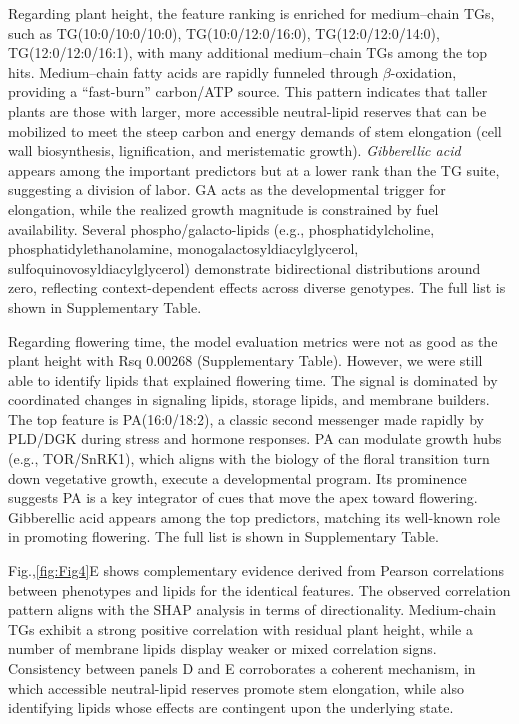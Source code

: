 \documentclass[10pt,letterpaper]{article}
\begin{document}
Regarding plant height, the feature ranking is enriched for medium–chain TGs, such as TG(10{:}0/10{:}0/10{:}0), TG(10{:}0/12{:}0/16{:}0), TG(12{:}0/12{:}0/14{:}0), TG(12{:}0/12{:}0/16{:}1), with many additional medium–chain TGs among the top hits. Medium–chain fatty acids are rapidly funneled through $\beta$-oxidation, providing a ``fast-burn'' carbon/ATP source. This pattern indicates that taller plants are those with larger, more accessible neutral-lipid reserves that can be mobilized to meet the steep carbon and energy demands of stem elongation (cell wall biosynthesis, lignification, and meristematic growth). \textit{Gibberellic acid} appears among the important predictors but at a lower rank than the TG suite, suggesting a division of labor. GA acts as the developmental trigger for elongation, while the realized growth magnitude is constrained by fuel availability. Several phospho/galacto-lipids (e.g., phosphatidylcholine, phosphatidylethanolamine, monogalactosyldiacylglycerol, sulfoquinovosyldiacylglycerol) demonstrate bidirectional distributions around zero, reflecting context-dependent effects across diverse genotypes. The full list is shown in Supplementary Table.

Regarding flowering time, the model evaluation metrics were not as good as the plant height with Rsq 0.00268 (Supplementary Table). However, we were still able to identify lipids that explained flowering time. The signal is dominated by coordinated changes in signaling lipids, storage lipids, and membrane builders. The top feature is PA(16:0/18:2), a classic second messenger made rapidly by PLD/DGK during stress and hormone responses. PA can modulate growth hubs (e.g., TOR/SnRK1), which aligns with the biology of the floral transition turn down vegetative growth, execute a developmental program. Its prominence suggests PA is a key integrator of cues that move the apex toward flowering. Gibberellic acid appears among the top predictors, matching its well-known role in promoting flowering. The full list is shown in Supplementary Table. 

Fig.,\ref{fig:Fig4}E shows complementary evidence derived from Pearson correlations between phenotypes and lipids for the identical features. The observed correlation pattern aligns with the SHAP analysis in terms of directionality. Medium-chain TGs exhibit a strong positive correlation with residual plant height, while a number of membrane lipids display weaker or mixed correlation signs. Consistency between panels D and E corroborates a coherent mechanism, in which accessible neutral-lipid reserves promote stem elongation, while also identifying lipids whose effects are contingent upon the underlying state.
\end{document}
